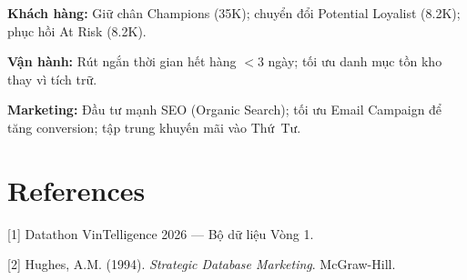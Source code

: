 \documentclass{article}
\begin{document}
\textbf{Khách hàng:} Giữ chân Champions (35K); chuyển đổi Potential Loyalist (8.2K); phục hồi At Risk (8.2K).

\textbf{Vận hành:} Rút ngắn thời gian hết hàng $<$3 ngày; tối ưu danh mục tồn kho thay vì tích trữ.

\textbf{Marketing:} Đầu tư mạnh SEO (Organic Search); tối ưu Email Campaign để tăng conversion; tập trung khuyến mãi vào Thứ~Tư.

\section*{References}
{\small
[1] Datathon VinTelligence 2026 --- Bộ dữ liệu Vòng 1.

[2] Hughes, A.M. (1994). \textit{Strategic Database Marketing}. McGraw-Hill.
}
\end{document}
